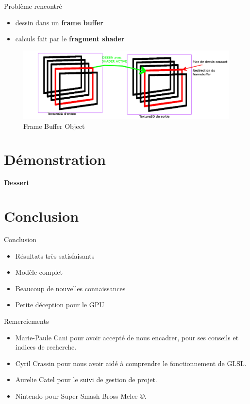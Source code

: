\documentclass{beamer}
\begin{document}
\begin{frame}{Problème rencontré}
  \begin{itemize}
  \item dessin dans un \textbf{frame buffer}
  \item calculs fait par le \textbf{fragment shader}
  \end{itemize}
  \begin{figure}[!h]
    \centering\includegraphics[scale=0.25]{Framebuffer.png}
    \caption{Frame Buffer Object}
    \label{AvecPerlin}
  \end{figure}
\end{frame}


\section{Démonstration}
\begin{frame}
  \begin{center}
    \textbf{Dessert}
  \end{center}
\end{frame}

\section{Conclusion}
\begin{frame}{Conclusion}
  \begin{itemize}
  \item Résultats très satisfaisants
  \item Modèle complet
  \item Beaucoup de nouvelles connaissances
  \item Petite déception pour le GPU
  \end{itemize}
\end{frame}

\begin{frame}{Remerciements}
  \begin{itemize}
  \item{Marie-Paule Cani} pour avoir accepté de nous encadrer, pour
    ses conseils et indices de recherche.
  \item{Cyril Crassin} pour nous avoir aidé à comprendre le
    fonctionnement de GLSL.
  \item{Aurelie Catel} pour le suivi de gestion de projet.
  \item{Nintendo\texttrademark} pour Super Smash Bross Melee ©.
  \end{itemize}
\end{frame}
\end{document}
